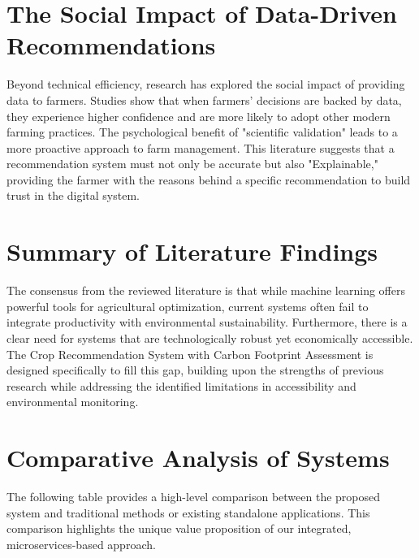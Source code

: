 \documentclass[12pt,a4paper]{report}
\begin{document}
\section{The Social Impact of Data-Driven Recommendations}
Beyond technical efficiency, research has explored the social impact of providing data to farmers. Studies show that when farmers' decisions are backed by data, they experience higher confidence and are more likely to adopt other modern farming practices. The psychological benefit of "scientific validation" leads to a more proactive approach to farm management. This literature suggests that a recommendation system must not only be accurate but also "Explainable," providing the farmer with the reasons behind a specific recommendation to build trust in the digital system.

\section{Summary of Literature Findings}
The consensus from the reviewed literature is that while machine learning offers powerful tools for agricultural optimization, current systems often fail to integrate productivity with environmental sustainability. Furthermore, there is a clear need for systems that are technologically robust yet economically accessible. The Crop Recommendation System with Carbon Footprint Assessment is designed specifically to fill this gap, building upon the strengths of previous research while addressing the identified limitations in accessibility and environmental monitoring.

\section{Comparative Analysis of Systems}
The following table provides a high-level comparison between the proposed system and traditional methods or existing standalone applications. This comparison highlights the unique value proposition of our integrated, microservices-based approach.
\end{document}
